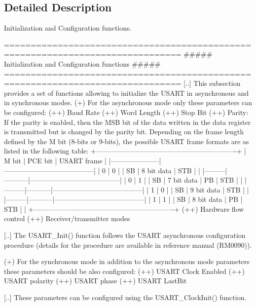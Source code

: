 \subsection{Detailed Description}
Initialization and Configuration functions. 

\begin{DoxyVerb} ===============================================================================
            ##### Initialization and Configuration functions #####
 ===============================================================================  
    [..]
    This subsection provides a set of functions allowing to initialize the USART 
    in asynchronous and in synchronous modes.
      (+) For the asynchronous mode only these parameters can be configured: 
        (++) Baud Rate
        (++) Word Length 
        (++) Stop Bit
        (++) Parity: If the parity is enabled, then the MSB bit of the data written
             in the data register is transmitted but is changed by the parity bit.
             Depending on the frame length defined by the M bit (8-bits or 9-bits),
             the possible USART frame formats are as listed in the following table:
   +-------------------------------------------------------------+     
   |   M bit |  PCE bit  |            USART frame                |
   |---------------------|---------------------------------------|             
   |    0    |    0      |    | SB | 8 bit data | STB |          |
   |---------|-----------|---------------------------------------|  
   |    0    |    1      |    | SB | 7 bit data | PB | STB |     |
   |---------|-----------|---------------------------------------|  
   |    1    |    0      |    | SB | 9 bit data | STB |          |
   |---------|-----------|---------------------------------------|  
   |    1    |    1      |    | SB | 8 bit data | PB | STB |     |
   +-------------------------------------------------------------+            
        (++) Hardware flow control
        (++) Receiver/transmitter modes

    [..]
    The USART_Init() function follows the USART  asynchronous configuration 
    procedure (details for the procedure are available in reference manual (RM0090)).

     (+) For the synchronous mode in addition to the asynchronous mode parameters these 
         parameters should be also configured:
        (++) USART Clock Enabled
        (++) USART polarity
        (++) USART phase
        (++) USART LastBit
  
    [..]
    These parameters can be configured using the USART_ClockInit() function.\end{DoxyVerb}
 

